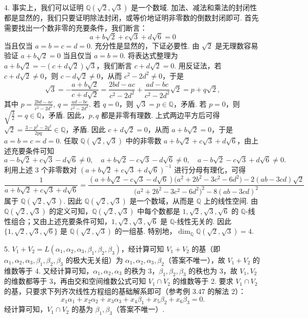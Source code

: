 \documentclass[UTF8, 12pt, fontset=fandol, oneside]{ctexart}
\begin{document}
4. 事实上，我们可以证明 $\mathbb{Q}(\sqrt{2},\sqrt{3})$ 是一个数域. 加法、减法和乘法的封闭性都是显然的，我们只要证明除法封闭，或等价地证明非零数的倒数封闭即可. 首先需要找出一个数非零的充要条件，我们断言：
\[
a+b\sqrt{2}+c\sqrt{3}+d\sqrt{6}=0
\]
当且仅当 $a=b=c=d=0$. 充分性是显然的，下证必要性. 由 $\sqrt{2}$ 是无理数容易验证 $a+b\sqrt{2}=0$ 当且仅当 $a=b=0$. 将表达式整理为 $a+b\sqrt{2}=-(c+d\sqrt{2})\sqrt{3}$，我们断言 $c+d\sqrt{2}=0$. 用反证法，若 $c+d\sqrt{2}\ne 0$，则 $c-d\sqrt{2}\ne 0$，从而 $c^2-2d^2\ne 0$，于是
\[
\sqrt{3}=-\frac{a+b\sqrt{2}}{c+d\sqrt{2}}
=\frac{2bd-ac}{c^2-2d^2}+\frac{ad-bc}{c^2-2d^2}\sqrt{2}=p+q\sqrt{2},
\]
其中 $p=\frac{2bd-ac}{c^2-2d^2}$, $q=\frac{ad-bc}{c^2-2d^2}$. 若 $q=0$，则 $\sqrt{3}=p\in\mathbb{Q}$，矛盾. 若 $p=0$，则 $\sqrt{\frac{3}{2}}=q\in\mathbb{Q}$，矛盾. 因此，$p,q$ 都是非零有理数. 上式两边平方后可得 $\sqrt{2}=\frac{3-p^2-2q^2}{2pq}\in\mathbb{Q}$，矛盾. 因此 $c+d\sqrt{2}=0$，从而 $a+b\sqrt{2}=0$，于是 $a=b=c=d=0$. 任取 $\mathbb{Q}(\sqrt{2},\sqrt{3})$ 中的非零数 $a+b\sqrt{2}+c\sqrt{3}+d\sqrt{6}$，由上述充要条件可知
\[
a-b\sqrt{2}+c\sqrt{3}-d\sqrt{6}\ne 0,\quad
a+b\sqrt{2}-c\sqrt{3}-d\sqrt{6}\ne 0,\quad
a-b\sqrt{2}-c\sqrt{3}+d\sqrt{6}\ne 0.
\]
利用上述 3 个非零数对 $(a+b\sqrt{2}+c\sqrt{3}+d\sqrt{6})^{-1}$ 进行分母有理化，可得
\[
\frac{1}{a+b\sqrt{2}+c\sqrt{3}+d\sqrt{6}}
=\frac{(a+b\sqrt{2}-c\sqrt{3}-d\sqrt{6})\bigl(a^2+2b^2-3c^2-6d^2\bigr)-2(ab-3cd)\sqrt{2}}{\bigl(a^2+2b^2-3c^2-6d^2\bigr)^2-8(ab-3cd)^2}
\]
属于 $\mathbb{Q}(\sqrt{2},\sqrt{3})$. 因此 $\mathbb{Q}(\sqrt{2},\sqrt{3})$ 是一个数域，从而是 $\mathbb{Q}$ 上的线性空间. 由 $\mathbb{Q}(\sqrt{2},\sqrt{3})$ 的定义可知，$\mathbb{Q}(\sqrt{2},\sqrt{3})$ 中每个数都是 $1,\sqrt{2},\sqrt{3},\sqrt{6}$ 的 $\mathbb{Q}$-线性组合；又由上述充要条件可知，$1,\sqrt{2},\sqrt{3},\sqrt{6}$ 是 $\mathbb{Q}$-线性无关的. 因此 $\{1,\sqrt{2},\sqrt{3},\sqrt{6}\}$ 是 $\mathbb{Q}(\sqrt{2},\sqrt{3})$ 的一组基. 特别地，$\dim_{\mathbb{Q}}\mathbb{Q}(\sqrt{2},\sqrt{3})=4$.

5. $V_1+V_2=L(\alpha_1,\alpha_2,\alpha_3,\beta_1,\beta_2,\beta_3)$，经计算可知 $V_1+V_2$ 的基（即 $\alpha_1,\alpha_2,\alpha_3,\beta_1,\beta_2,\beta_3$ 的极大无关组）为 $\alpha_1,\alpha_2,\alpha_3,\beta_2$（答案不唯一），故 $V_1+V_2$ 的维数等于 4. 又经计算可知，$\alpha_1,\alpha_2,\alpha_3$ 的秩为 3，$\beta_1,\beta_2,\beta_3$ 的秩也为 3，故 $V_1,V_2$ 的维数都等于 3，再由交和空间维数公式可知 $V_1\cap V_2$ 的维数等于 2. 要求 $V_1\cap V_2$ 的基，只要求下列齐次线性方程组的基础解系即可（参考例 3.47 的解法 2）：
\[
x_1\alpha_1+x_2\alpha_2+x_3\alpha_3+x_4\beta_1+x_5\beta_2+x_6\beta_3=0.
\]
经计算可知，$V_1\cap V_2$ 的基为 $\beta_1,\beta_3$（答案不唯一）.
\end{document}
